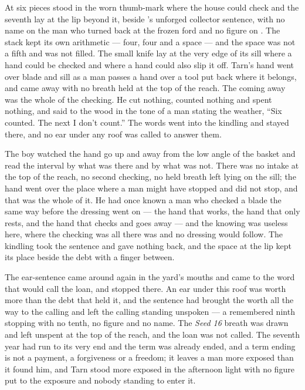 \scenebreak

At  six pieces stood in the worn thumb-mark where the house could check and the seventh lay at the lip beyond it, beside 's unforged collector sentence, with no name on the man who turned back at the frozen ford and no figure on . The stack kept its own arithmetic --- four, four and a space --- and the space was not a fifth and was not filled. The small knife lay at the very edge of its sill where a hand could be checked and where a hand could also slip it off. Tarn's hand went over blade and sill as a man passes a hand over a tool put back where it belongs, and came away with no breath held at the top of the reach. The coming away was the whole of the checking. He cut nothing, counted nothing and spent nothing, and said to the wood in the tone of a man stating the weather, “Six counted. The next I don't count.” The words went into the kindling and stayed there, and no ear under any roof was called to answer them.

The boy watched the hand go up and away from the low angle of the basket and read the interval by what was there and by what was not. There was no intake at the top of the reach, no second checking, no held breath left lying on the sill; the hand went over the place where a man might have stopped and did not stop, and that was the whole of it. He had once known a man who checked a blade the same way before the dressing went on --- the hand that works, the hand that only rests, and the hand that checks and goes away --- and the knowing was useless here, where the checking was all there was and no dressing would follow. The kindling took the sentence and gave nothing back, and the space at the lip kept its place beside the debt with a finger between.

The ear-sentence came around again in the yard's mouths and came to the word that would call the loan, and stopped there. An ear under this roof was worth more than the debt that held it, and the sentence had brought the worth all the way to the calling and left the calling standing unspoken --- a remembered ninth stopping with no tenth, no figure and no name. The \emph{Seed 16} breath was drawn and left unspent at the top of the reach, and the loan was not called. The seventh year had run to its very end and the term was already ended, and a term ending is not a payment, a forgiveness or a freedom; it leaves a man more exposed than it found him, and Tarn stood more exposed in the afternoon light with no figure put to the exposure and nobody standing to enter it.


